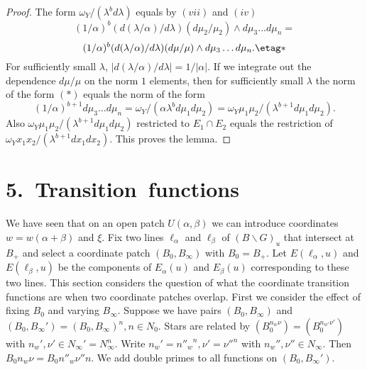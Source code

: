 \documentclass{memo-l}
\theoremstyle{definition}
\theoremstyle{remark}
\numberwithin{section}{chapter}
\numberwithin{equation}{chapter}
\begin{document}
\begin{proof}
   The form ${\omega}_{Y}/({\lambda}^{b}d{\lambda})$ equals by $(vii)$ and
$(iv)$
$$
(1/{\alpha})^{b}(d({\lambda}/{\alpha})/d{\lambda})(d{\mu}_{2}/{\mu}_{2})\wedge
d{\mu}_{3}\ldots d{\mu}_{n} =
$$
$$
(1/{\alpha})^{b}(d({\lambda}/{\alpha})/d{\lambda})(d{\mu}/{\mu})\wedge
d{\mu}_{3}\ldots d{\mu}_{n} . \etag *
$$
For sufficiently small ${\lambda}$, $\vert
d({\lambda}/{\alpha})/d{\lambda}\vert = 1/\vert {\alpha}\vert .$ If we
integrate out the dependence $d{\mu}/{\mu}$ on the norm $1$ elements, then
for sufficiently small ${\lambda}$ the norm of the form $(*)$ equals the
norm of the form
$$
(1/{\alpha})^{b+1}d{\mu}_{3}\ldots d{\mu}_{n} =
{\omega}_{Y}/({\alpha}{\lambda}^{b}d{\mu}_{1}d{\mu}_{2}) =
{\omega}_{Y}{\mu}_{1}{\mu}_{2}/({\lambda}^{b+1}d{\mu}_{1}d{\mu}_{2}).
$$
Also ${\omega}_{Y}{\mu}_{1}{\mu}_{2}/({\lambda}^{b+1}d{\mu}_{1}d{\mu}_{2})$
restricted to $E_{1} \cap E_{2}$ equals the restriction of
\newline
${\omega}_{Y}x_{1}x_{2}/({\lambda}^{b+1}dx_{1}dx_{2})$.  This proves the
lemma.
\end{proof} 

\section{ 5.\  Transition\ functions}

   We have seen that on an open patch $U({\alpha},{\beta})$ we can
introduce coordinates $w = w({\alpha}+{\beta})$ and ${\xi}$.  Fix two lines
${\ell}_{{\alpha}}$ and ${\ell}_{{\beta}}$ of $(B\backslash G)_{u}$ that
intersect at $B_{+}$ and select a coordinate patch $(B_{0},B_{{\infty}})$
with $B_{0} = B_{+}$.  Let $E({\ell}_{{\alpha}},u)$ and
$E({\ell}_{{\beta}},u)$ be the components of $E_{{\alpha}}(u)$ and
$E_{{\beta}}(u)$ corresponding to these two lines.  This section considers
the question of what the coordinate transition functions are when two
coordinate patches overlap.  First we consider the effect of fixing $B_{0}$
and varying $B_{{\infty}}$.  Suppose we have pairs $(B_{0},B_{{\infty}})$
and $(B_{0},B_{{\infty}}') = (B_{0},B_{{\infty}})^{n}, n  \in  N_{0}$.
Stars are related by $(B_{0}^{n_w\nu}) = (B_{0}^{n_{w'}\nu'})$ with 
$n_{w}', {\nu}' \in N_{{\infty}}' =
N_{{\infty}}^{n}$.  Write $n_{w}' = {n''_w}^n, {\nu}' = {\nu''}^{n}$ with
$n_{w}'', {\nu''} \in  N_{{\infty}}$.  Then $B_{0}n_{w}{\nu} =
B_{0}n''_{w}{\nu''}n$.  We add double primes to all functions on
$(B_{0},B_{{\infty}}')$.
\end{document}
